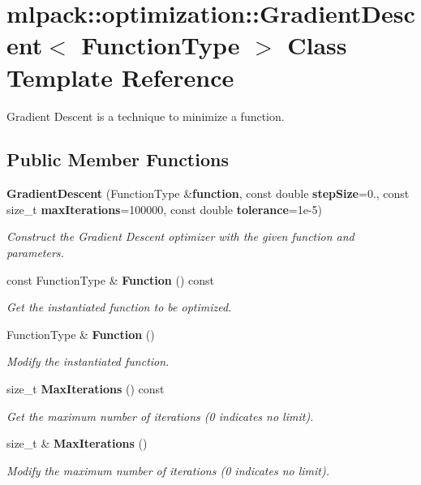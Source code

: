 \section{mlpack\+:\+:optimization\+:\+:Gradient\+Descent$<$ Function\+Type $>$ Class Template Reference}
\label{classmlpack_1_1optimization_1_1GradientDescent}


Gradient Descent is a technique to minimize a function.  


\subsection*{Public Member Functions}
\begin{DoxyCompactItemize}
\item 
{\bf Gradient\+Descent} (Function\+Type \&{\bf function}, const double {\bf step\+Size}=0., const size\+\_\+t {\bf max\+Iterations}=100000, const double {\bf tolerance}=1e-\/5)
\begin{DoxyCompactList}\small\item\em Construct the Gradient Descent optimizer with the given function and parameters. \end{DoxyCompactList}\item 
const Function\+Type \& {\bf Function} () const 
\begin{DoxyCompactList}\small\item\em Get the instantiated function to be optimized. \end{DoxyCompactList}\item 
Function\+Type \& {\bf Function} ()
\begin{DoxyCompactList}\small\item\em Modify the instantiated function. \end{DoxyCompactList}\item 
size\+\_\+t {\bf Max\+Iterations} () const 
\begin{DoxyCompactList}\small\item\em Get the maximum number of iterations (0 indicates no limit). \end{DoxyCompactList}\item 
size\+\_\+t \& {\bf Max\+Iterations} ()
\begin{DoxyCompactList}\small\item\em Modify the maximum number of iterations (0 indicates no limit). \end{DoxyCompactList}\item 

\end{DoxyCompactItemize}
